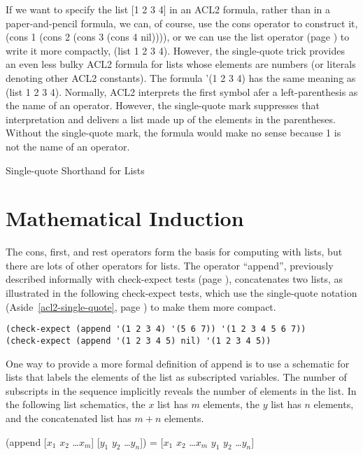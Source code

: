 \begin{aside}
If we want to specify the list [1 2 3 4] in an ACL2 formula,
rather than in a paper-and-pencil formula,
we can, of course, use the cons operator to construct it,
(cons 1 (cons 2 (cons 3 (cons 4 nil)))),
or we can use the list operator (page \pageref{list-op-informal}) to write it more compactly,
(list 1 2 3 4).
However, the single-quote trick provides an even less bulky ACL2 formula for lists
whose elements are numbers (or literals denoting other ACL2 constants).
The formula
'(1 2 3 4) has the same meaning as (list 1 2 3 4).
Normally, ACL2 interprets the first symbol afer a left-parenthesis
as the name of an operator.
However, the single-quote mark suppresses that interpretation and
delivers a list made up of the elements in the parentheses.
Without the single-quote mark,
the formula would make no sense because 1 is not the name of an operator.
\caption{Single-quote Shorthand for Lists}
\label{acl2-single-quote}
\end{aside}

\section{Mathematical Induction}
\label{sec:induction}
The cons, first, and rest operators form the basis for computing with lists,
but there are lots of other operators for lists.
The operator ``append'', previously described informally with check-expect tests
(page \pageref{append-op-informal}), concatenates two lists, as illustrated
in the following check-expect tests,
which use the single-quote notation (Aside~\ref{acl2-single-quote}, page \pageref{acl2-single-quote})
to make them more compact.

\begin{Verbatim}
(check-expect (append '(1 2 3 4) '(5 6 7)) '(1 2 3 4 5 6 7))
(check-expect (append '(1 2 3 4 5) nil) '(1 2 3 4 5))
\end{Verbatim}

One way to provide a more formal definition of append is
to use a schematic for lists
that labels the elements of the list as subscripted variables.
The number of subscripts in the sequence implicitly reveals the number of elements in the list.
\label{list-schematic} In the following list schematics,
the $x$ list has $m$ elements, the $y$ list has $n$ elements,
and the concatenated list has $m+n$ elements.
\begin{samepage}
\begin{center}
(append [$x_1$ $x_2$ \dots $x_m$] [$y_1$ $y_2$ \dots $y_n$]) = [$x_1$ $x_2$ \dots $x_m$ $y_1$ $y_2$ \dots $y_n$]
\end{center}
\end{samepage}

